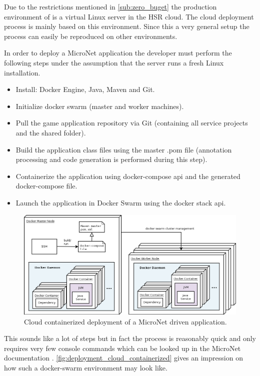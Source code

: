 Due to the restrictions mentioned in \autoref{sub:zero_buget} the production
environment of \mn{} is a virtual Linux server in the HSR cloud. The cloud
deployment process is mainly based on this environment. Since this a very
general setup the process can easily be reproduced on other environments.

In order to deploy a MicroNet \ms{} application the developer must perform the
following steps under the assumption that the server runs a fresh Linux
installation.

\begin{itemize}
  \item Install: Docker Engine, Java, Maven and Git.
  \item Initialize docker swarm (master and worker machines).
  \item Pull the game application repository via Git (containing all service
  projects and the shared folder).
  \item Build the application class files using the master .pom file (annotation
  processing and code generation is performed during this step).
  \item Containerize the application using docker-compose \gls{api} and the generated
  docker-compose file.
  \item Launch the application in Docker Swarm using the docker stack \gls{api}.
\end{itemize}

\begin{figure}
	\hspace*{-0.8cm}
	\centering
	\includegraphics[width=1.1\textwidth]{images/architecture/DeploymentCloudContainerized}
	\caption{Cloud containerized deployment of a MicroNet driven application.}
	\label{fig:deployment_cloud_containerized}
\end{figure}

This sounds like a lot of steps but in fact the process is reasonably quick and
only requires very few console commands which can be looked up in the MicroNet
documentation \cite{micronet2017doku}.
\autoref{fig:deployment_cloud_containerized} gives an impression on how such a
docker-swarm environment may look like.

